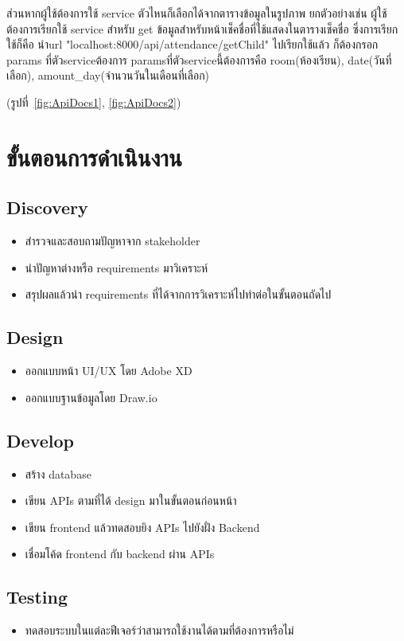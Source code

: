ส่วนหากผู้ใช้ต้องการใช้ service ตัวไหนก็เลือกได้จากตารางข้อมูลในรูปภาพ ยกตัวอย่างเช่น ผู้ใช้ต้องการเรียกใช้ service สำหรับ get ข้อมูลสำหรับหน้าเช็คชื่อที่ใช้แสดงในตารางเช็คชื่อ
ซึ่งการเรียกใช้ก็คือ นำurl "localhost:8000/api/attendance/getChild" ไปเรียกใช้แล้ว ก็ต้องกรอก params ที่ตัวserviceต้องการ paramsที่ตัวserviceนี้ต้องการคือ room(ห้องเรียน), date(วันที่เลือก), amount\_day(จำนวนวันในเดือนที่เลือก)

(รูปที่~\ref{fig:ApiDocs1}, \ref{fig:ApiDocs2})

\section{ขั้นตอนการดำเนินงาน}
\subsection{Discovery}
\begin{itemize}
  \item สำรวจและสอบถามปัญหาจาก stakeholder
  \item นำปัญหาต่างหรือ requirements มาวิเคราะห์
  \item สรุปผลแล้วนำ requirements ที่ได้จากการวิเคราะห์ไปทำต่อในขั้นตอนถัดไป
\end{itemize}

\subsection{Design}
\begin{itemize}
  \item ออกแบบหน้า UI/UX โดย Adobe XD
  \item ออกแบบฐานข้อมูลโดย Draw.io
\end{itemize}

\subsection{Develop}
\begin{itemize}
  \item สร้าง database
  \item เขียน APIs ตามที่ได้ design มาในขั้นตอนก่อนหน้า
  \item เขียน frontend แล้วทดสอบยิง APIs ไปยังฝั่ง Backend
  \item เชื่อมโค้ด frontend กับ backend ผ่าน APIs
\end{itemize}

\subsection{Testing}
\begin{itemize}
  \item ทดสอบระบบในแต่ละฟีเจอร์ว่าสามารถใช้งานได้ตามที่ต้องการหรือไม่
\end{itemize}

